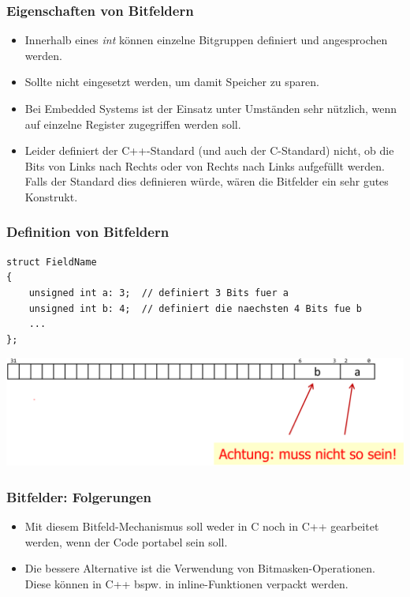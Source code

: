\subsubsection{Eigenschaften von Bitfeldern}
\begin{itemize}
	\item Innerhalb eines \emph{int} können einzelne Bitgruppen definiert und angesprochen werden.
	\item Sollte nicht eingesetzt werden, um damit Speicher zu sparen.
	\item Bei Embedded Systems ist der Einsatz unter Umständen sehr nützlich, wenn auf einzelne Register zugegriffen werden soll.
	\item[\-]\begin{achtung}
		Leider definiert der C++-Standard (und auch der C-Standard) nicht, ob die Bits von Links nach Rechts oder von Rechts nach Links aufgefüllt werden. Falls der Standard dies definieren würde, wären die Bitfelder ein sehr gutes Konstrukt.
	\end{achtung}
\end{itemize}

\subsubsection{Definition von Bitfeldern}
\vspace{-\baselineskip}
\begin{minipage}{0.8\linewidth}
\begin{lstlisting}
struct FieldName
{
	unsigned int a: 3;	// definiert 3 Bits fuer a
	unsigned int b: 4;	// definiert die naechsten 4 Bits fue b
	...
};
\end{lstlisting}
\end{minipage}
\begin{minipage}{0.6\linewidth}
\includegraphics[width=\linewidth]{images/bitfelder.png}
\end{minipage}

\subsubsection{Bitfelder: Folgerungen}
\begin{itemize}
	\item Mit diesem Bitfeld-Mechanismus soll weder in C noch in C++ gearbeitet werden, wenn der Code portabel sein soll.
	\item Die bessere Alternative ist die Verwendung von Bitmasken-Operationen. Diese können in C++ bspw. in inline-Funktionen verpackt werden.
\end{itemize}
\vfill
\pagebreak\newpage

